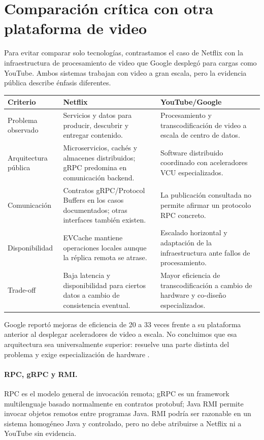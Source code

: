 \section{Comparación crítica con otra plataforma de video}

Para evitar comparar solo tecnologías, contrastamos el caso de Netflix con la
infraestructura de procesamiento de video que Google desplegó para cargas como
YouTube. Ambos sistemas trabajan con video a gran escala, pero la evidencia
pública describe énfasis diferentes.

\begin{center}
\small
\begin{tabularx}{\linewidth}{@{}p{2.5cm}XX@{}}
\toprule
\textbf{Criterio} & \textbf{Netflix} & \textbf{YouTube/Google} \\
\midrule
Problema observado & Servicios y datos para producir, descubrir y entregar
contenido. & Procesamiento y transcodificación de video a escala de centro de
datos. \\
Arquitectura pública & Microservicios, cachés y almacenes distribuidos; gRPC
predomina en comunicación backend. & Software distribuido coordinado con
aceleradores VCU especializados. \\
Comunicación & Contratos gRPC/Protocol Buffers en los casos documentados; otras
interfaces también existen. & La publicación consultada no permite afirmar un
protocolo RPC concreto. \\
Disponibilidad & EVCache mantiene operaciones locales aunque la réplica remota
se atrase. & Escalado horizontal y adaptación de la infraestructura ante fallos
de procesamiento. \\
Trade-off & Baja latencia y disponibilidad para ciertos datos a cambio de
consistencia eventual. & Mayor eficiencia de transcodificación a cambio de
hardware y co-diseño especializados. \\
\bottomrule
\end{tabularx}
\end{center}

Google reportó mejoras de eficiencia de 20 a 33 veces frente a su plataforma
anterior al desplegar aceleradores de video a escala. No concluimos que esa
arquitectura sea universalmente superior: resuelve una parte distinta del
problema y exige especialización de hardware \cite{google-vcu}.

\paragraph{RPC, gRPC y RMI.} RPC es el modelo general de invocación remota;
gRPC es un framework multilenguaje basado normalmente en contratos protobuf;
Java RMI permite invocar objetos remotos entre programas Java. RMI podría ser
razonable en un sistema homogéneo Java y controlado, pero no debe atribuirse a
Netflix ni a YouTube sin evidencia.
